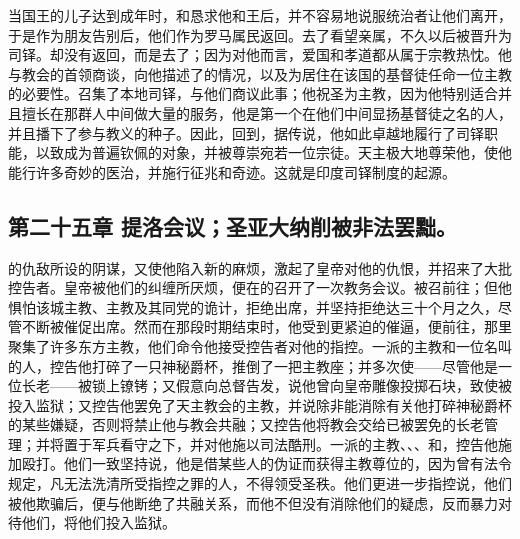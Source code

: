 当国王的儿子达到成年时，和恳求他和王后，并不容易地说服统治者让他们离开，于是作为朋友告别后，他们作为罗马属民返回。去了看望亲属，不久以后被晋升为司铎。却没有返回，而是去了；因为对他而言，爱国和孝道都从属于宗教热忱。他与教会的首领商谈，向他描述了的情况，以及为居住在该国的基督徒任命一位主教的必要性。召集了本地司铎，与他们商议此事；他祝圣为主教，因为他特别适合并且擅长在那群人中间做大量的服务，他是第一个在他们中间显扬基督徒之名的人，并且播下了参与教义的种子。因此，回到，据传说，他如此卓越地履行了司铎职能，以致成为普遍钦佩的对象，并被尊崇宛若一位宗徒。天主极大地尊荣他，使他能行许多奇妙的医治，并施行征兆和奇迹。这就是印度司铎制度的起源。\par


\subsection{第二十五章 提洛会议；圣亚大纳削被非法罢黜。}

的仇敌所设的阴谋，又使他陷入新的麻烦，激起了皇帝对他的仇恨，并招来了大批控告者。皇帝被他们的纠缠所厌烦，便在的召开了一次教务会议。被召前往；但他惧怕该城主教、主教及其同党的诡计，拒绝出席，并坚持拒绝达三十个月之久，尽管不断被催促出席。然而在那段时期结束时，他受到更紧迫的催逼，便前往，那里聚集了许多东方主教，他们命令他接受控告者对他的指控。一派的主教和一位名叫的人，控告他打碎了一只神秘爵杯，推倒了一把主教座；并多次使——尽管他是一位长老——被锁上镣铐；又假意向总督告发，说他曾向皇帝雕像投掷石块，致使被投入监狱；又控告他罢免了天主教会的主教，并说除非能消除有关他打碎神秘爵杯的某些嫌疑，否则将禁止他与教会共融；又控告他将教会交给已被罢免的长老管理；并将置于军兵看守之下，并对他施以司法酷刑。一派的主教、、、和，控告他施加殴打。他们一致坚持说，他是借某些人的伪证而获得主教尊位的，因为曾有法令规定，凡无法洗清所受指控之罪的人，不得领受圣秩。他们更进一步指控说，他们被他欺骗后，便与他断绝了共融关系，而他不但没有消除他们的疑虑，反而暴力对待他们，将他们投入监狱。\newline{}\par

